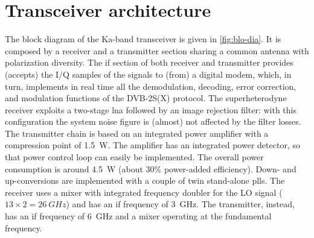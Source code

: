 \documentclass[conference,10pt,a4paper]{IEEEtran}%
\begin{document}
\section{Transceiver architecture}
The block diagram of the Ka-band transceiver is given in \cref{fig:blo-dia}.
It is composed by a receiver and a transmitter section sharing a common antenna with polarization diversity.
The \ac{if} section of both receiver and transmitter provides (accepts) the I/Q samples of the signals to (from) a digital modem, which, in turn, implements in real time all the demodulation, decoding, error correction, and modulation functions of the DVB-2S(X) protocol.
The superheterodyne receiver exploits a two-stage \ac{lna} followed by an image rejection filter: with this configuration the system noise figure is (almost) not affected by the filter losses.
The transmitter chain is based on an integrated power amplifier with a compression point of \SI{1.5}{\watt}.
The amplifier has an integrated power detector, so that power control loop can easily be implemented.
The overall power consumption is around \SI{4.5}{\watt} (about 30\% power-added efficiency).
Down- and up-conversions are implemented with a couple of twin stand-alone \glspl{pll}.
The receiver uses a mixer with integrated frequency doubler for the LO signal ($13 \times 2=\SI{26}{GHz}$) and has an \ac{if} frequency of \SI{3}{GHz}.
The transmitter, instead, has an \ac{if} frequency of \SI{6}{GHz} and a mixer operating at the fundamental frequency.
\end{document}
